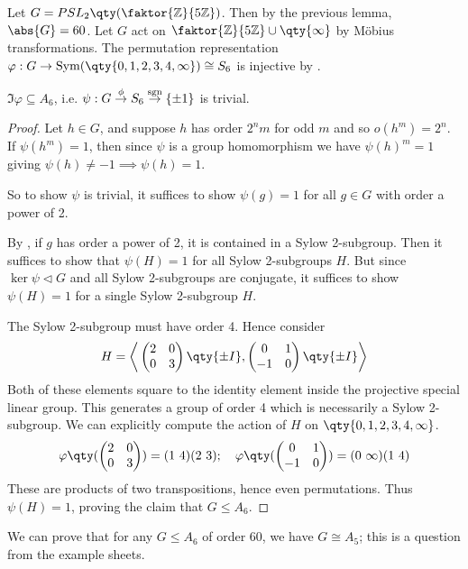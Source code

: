 \begin{example}
	Let $G = PSL_2\qty(\faktor{\mathbb Z}{5\mathbb Z})$.
	Then by the previous lemma, $\abs{G} = 60$.
	Let $G$ act on $\faktor{\mathbb Z}{5\mathbb Z} \cup \qty{\infty}$ by M\"obius transformations.
	The permutation representation $\varphi : G \to \Sym(\qty{0,1,2,3,4,\infty}) \cong S_6$ is injective by .

	\begin{claim}
		$\Im \varphi \subseteq A_6$, i.e. $\psi : G \overset{\phi}\to S_6 \overset{\operatorname{sgn}}\to \{\pm 1\}$ is trivial.
	\end{claim} 

	\begin{proof}
		Let $h\in G$, and suppose $h$ has order $2^n m$ for odd $m$ and so $o(h^m) = 2^n$.
		If $\psi(h^m) = 1$, then since $\psi$ is a group homomorphism we have $\psi(h)^m = 1$ giving $\psi(h) \neq -1 \implies \psi(h) = 1$.

		So to show $\psi$ is trivial, it suffices to show $\psi(g) = 1$ for all $g \in G$ with order a power of 2.

		By , if $g$ has order a power of 2, it is contained in a Sylow 2-subgroup.
		Then it suffices to show that $\psi(H) = 1$ for all Sylow 2-subgroups $H$.
		But since $\ker \psi \triangleleft G$ and all Sylow 2-subgroups are conjugate, it suffices to show $\psi(H) = 1$ for a single Sylow 2-subgroup $H$.

		The Sylow 2-subgroup must have order 4.
		Hence consider
		\begin{align*}
			H = \genset{ \begin{pmatrix}
					2 & 0 \\
					0 & 3
				\end{pmatrix} \qty{\pm I}, \begin{pmatrix}
					0  & 1 \\
					-1 & 0
				\end{pmatrix} \qty{\pm I} }
		\end{align*}
		Both of these elements square to the identity element inside the projective special linear group.
		This generates a group of order 4 which is necessarily a Sylow 2-subgroup.
		We can explicitly compute the action of $H$ on $\qty{0,1,2,3,4,\infty}$.
		\begin{align*}
			\varphi\qty(\begin{pmatrix}
					2 & 0 \\
					0 & 3
				\end{pmatrix}) = (1\ 4)(2\ 3);\quad \varphi\qty(\begin{pmatrix}
					0  & 1 \\
					-1 & 0
				\end{pmatrix}) = (0\ \infty)(1\ 4)
		\end{align*}
		These are products of two transpositions, hence even permutations.
		Thus $\psi(H) = 1$, proving the claim that $G \leq A_6$.
	\end{proof} 

	We can prove that for any $G \leq A_6$ of order 60, we have $G \cong A_5$; this is a question from the example sheets.
\end{example}

